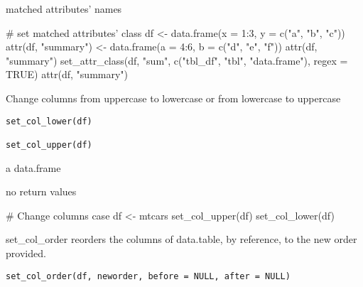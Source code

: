 \documentclass[letterpaper]{book}
\begin{document}
%
\begin{Value}
matched attributes' names
\end{Value}
%
\begin{Examples}
\begin{ExampleCode}
# set matched attributes' class
df <- data.frame(x = 1:3, y = c("a", "b", "c"))
attr(df, "summary") <- data.frame(a = 4:6, b = c("d", "e", "f"))
attr(df, "summary")
set_attr_class(df, "sum", c("tbl_df", "tbl", "data.frame"), regex = TRUE)
attr(df, "summary")

\end{ExampleCode}
\end{Examples}
%
\begin{Description}
Change columns from uppercase to lowercase or from lowercase to uppercase
\end{Description}
%
\begin{Usage}
\begin{verbatim}
set_col_lower(df)

set_col_upper(df)
\end{verbatim}
\end{Usage}
%
\begin{Arguments}
\begin{ldescription}
\item[\code{df}] a data.frame
\end{ldescription}
\end{Arguments}
%
\begin{Value}
no return values
\end{Value}
%
\begin{Examples}
\begin{ExampleCode}
# Change columns case
df <- mtcars
set_col_upper(df)
set_col_lower(df)

\end{ExampleCode}
\end{Examples}
%
\begin{Description}
set\_col\_order reorders the columns of data.table, by reference, to the new order provided.
\end{Description}
%
\begin{Usage}
\begin{verbatim}
set_col_order(df, neworder, before = NULL, after = NULL)
\end{verbatim}
\end{Usage}
\end{document}
